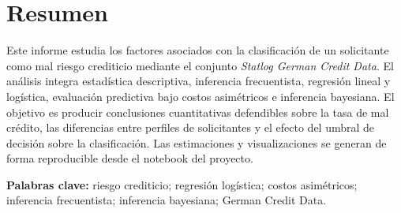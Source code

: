 \section*{Resumen}

Este informe estudia los factores asociados con la clasificación de un
solicitante como mal riesgo crediticio mediante el conjunto
\textit{Statlog German Credit Data}. El análisis integra estadística
descriptiva, inferencia frecuentista, regresión lineal y logística,
evaluación predictiva bajo costos asimétricos e inferencia bayesiana. El
objetivo es producir conclusiones cuantitativas defendibles sobre la tasa
de mal crédito, las diferencias entre perfiles de solicitantes y el efecto
del umbral de decisión sobre la clasificación. Las estimaciones y
visualizaciones se generan de forma reproducible desde el notebook del
proyecto.

\medskip

\noindent
\textbf{Palabras clave:}
riesgo crediticio; regresión logística; costos asimétricos; inferencia
frecuentista; inferencia bayesiana; German Credit Data.
